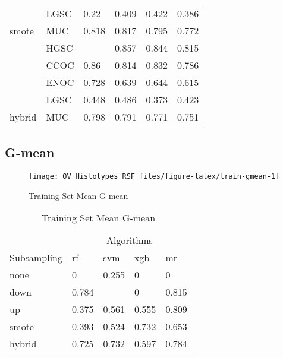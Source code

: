 \documentclass[
]{report}
\begin{document}
\begin{table}
\begin{tabular}[t]{l|l|l|l|l|l}
\cline{2-6}
 & LGSC & 0.22 & 0.409 & 0.422 & 0.386\\
\cline{2-6}
\multirow{-5}{*}{\raggedright\arraybackslash smote} & MUC & 0.818 & 0.817 & 0.795 & 0.772\\
\cline{1-6}
 & HGSC & \cellcolor[HTML]{90ee90}{0.876} & 0.857 & 0.844 & 0.815\\
\cline{2-6}
 & CCOC & 0.86 & 0.814 & 0.832 & 0.786\\
\cline{2-6}
 & ENOC & 0.728 & 0.639 & 0.644 & 0.615\\
\cline{2-6}
 & LGSC & 0.448 & 0.486 & 0.373 & 0.423\\
\cline{2-6}
\multirow{-5}{*}{\raggedright\arraybackslash hybrid} & MUC & 0.798 & 0.791 & 0.771 & 0.751\\
\hline
\end{tabular}
\end{table}

\hypertarget{g-mean}{%
\subsection{G-mean}\label{g-mean}}

\begin{figure}[H]

{\centering \texttt{[image: OV\_Histotypes\_RSF\_files/figure-latex/train-gmean-1]} 

}

\caption{Training Set Mean G-mean}\label{fig:train-gmean}
\end{figure}

\begin{table}

\caption{\label{tab:train-gmean-table}Training Set Mean G-mean}
\centering
\begin{tabular}[t]{l|l|l|l|l}
\hline
\multicolumn{1}{c|}{ } & \multicolumn{4}{c}{Algorithms} \\
\cline{2-5}
Subsampling & rf & svm & xgb & mr\\
\hline
none & 0 & 0.255 & 0 & 0\\
\hline
down & 0.784 & \cellcolor[HTML]{90ee90}{0.831} & 0 & 0.815\\
\hline
up & 0.375 & 0.561 & 0.555 & 0.809\\
\hline
smote & 0.393 & 0.524 & 0.732 & 0.653\\
\hline
hybrid & 0.725 & 0.732 & 0.597 & 0.784\\
\hline
\end{tabular}
\end{table}
\end{document}
